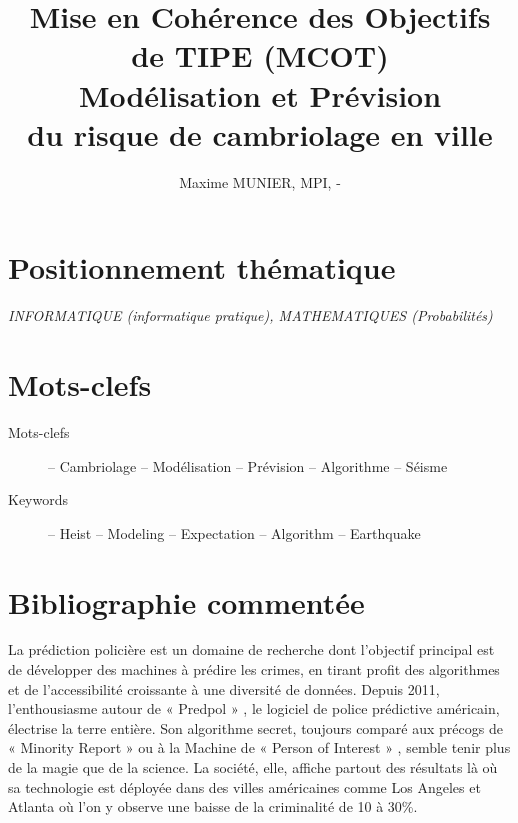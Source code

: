 \documentclass[12pt,a4paper]{article}
\title{Mise en Cohérence des Objectifs de TIPE (MCOT) \\
Modélisation et Prévision \\
du risque de cambriolage en ville}
\author{Maxime MUNIER, MPI\oldstylenums{}, \oldstylenums{\arabic{byear}}-\oldstylenums{\the\year} }
\date{}
\newcommand{\positionnementThematique}[1]{
\section*{Positionnement thématique}
{\it #1}}
\newcommand{\motclefs}[2]{
\section*{Mots-clefs}
\begin{description}
\item[Mots-clefs] -- #1 
\item[Keywords]   -- #2
\end{description}
}
\begin{document}
\maketitle

\positionnementThematique{INFORMATIQUE (informatique pratique), MATHEMATIQUES (Probabilités)}

\motclefs{Cambriolage -- Modélisation -- Prévision -- Algorithme -- Séisme}{Heist -- Modeling -- Expectation -- Algorithm -- Earthquake}


\section*{Bibliographie commentée}

La prédiction policière \cite{Predic} est un domaine de recherche dont l’objectif principal est de développer des machines à prédire les crimes, en tirant profit des algorithmes et de l’accessibilité croissante à une diversité de données. Depuis 2011, l’enthousiasme autour de « Predpol » \cite{Lemonde}, le logiciel de police prédictive américain, électrise la terre entière. Son algorithme secret, toujours comparé aux précogs de « Minority Report » ou à la Machine de « Person of Interest » \cite{Interstices}, semble tenir plus de la magie que de la science. La société, elle, affiche partout des résultats là où sa technologie est déployée dans des villes américaines comme Los Angeles et Atlanta où l'on y observe une baisse de la criminalité de 10 à 30\%. 
\end{document}
